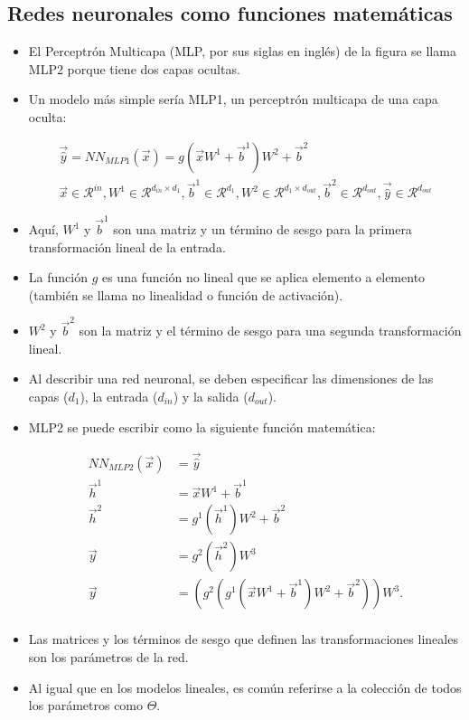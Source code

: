\subsection{Redes neuronales como funciones matemáticas}

\begin{itemize}
\item El Perceptrón Multicapa (MLP, por sus siglas en inglés) de la figura se llama MLP2 porque tiene dos capas ocultas.
\item Un modelo más simple sería MLP1, un perceptrón multicapa de una capa oculta:
\begin{center}
\begin{equation}
\begin{split}
\vec{\hat{y}} = NN_{MLP1}(\vec{x}) = g(\vec{x}W^{1}+\vec{b}^{1})W^{2}+\vec{b}^{2} \\
\vec{x} \in \mathcal{R}^{in}, W^{1} \in \mathcal{R}^{d_{in}\times d_{1}}, \vec{b}^{1} \in \mathcal{R}^{d_{1}}, W^{2} \in \mathcal{R}^{d_{1}\times d_{out}}, \vec{b}^{2} \in \mathcal{R}^{d_{out}}, \vec{\hat{y}} \in \mathcal{R}^{d_{out}}
\end{split}
\end{equation}
\end{center}

\item Aquí, $W^{1}$ y $\vec{b}^{1}$ son una matriz y un término de sesgo para la primera transformación lineal de la entrada.
\item La función $g$ es una función no lineal que se aplica elemento a elemento (también se llama no linealidad o función de activación).
\item $W^{2}$ y $\vec{b}^{2}$ son la matriz y el término de sesgo para una segunda transformación lineal.

\item Al describir una red neuronal, se deben especificar las dimensiones de las capas ($d_{1}$), la entrada ($d_{in}$) y la salida ($d_{out}$).
\item MLP2 se puede escribir como la siguiente función matemática:
\begin{center}
\begin{equation}
\begin{split}
NN_{MLP2}(\vec{x}) & =  \vec{\hat{y}}  \\
\vec{h}^{1} &  = \vec{x}W^{1}+\vec{b}^{1} \\
\vec{h}^{2} &  = g^{1}(\vec{h}^{1})W^{2}+\vec{b}^{2} \\
\vec{y} &  = g^{2}(\vec{h}^{2})W^{3}\\
\vec{y} &  = (g^2(g^1(\vec{x}W^{1}+\vec{b}^{1})W^2+\vec{b}^2))W^3.\\
\end{split}
\end{equation}
\end{center}
\item Las matrices y los términos de sesgo que definen las transformaciones lineales son los parámetros de la red.
\item Al igual que en los modelos lineales, es común referirse a la colección de todos los parámetros como $\Theta$.
\end{itemize}

